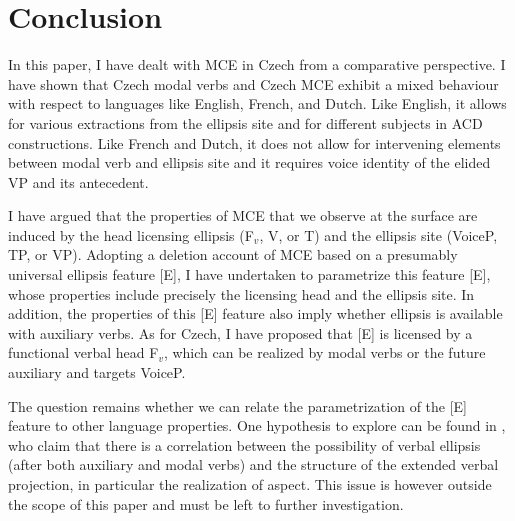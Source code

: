 \documentclass[output=paper,colorlinks,citecolor=brown,
modfonts
]{langscibook}
\begin{document}
\section{Conclusion} \label{sec:6}

In this paper, I have dealt with MCE in Czech from a comparative perspective. I have shown that Czech modal verbs and Czech MCE exhibit a mixed behaviour with respect to languages like English, French, and Dutch. Like English, it allows for various extractions from the ellipsis site and for different subjects in ACD constructions. Like French and Dutch, it does not allow for intervening elements between modal verb and ellipsis site and it requires voice identity of the elided VP and its antecedent. 

I have argued that the properties of MCE that we observe at the surface are induced by the head licensing ellipsis (F$_{v}$, V, or T) and the ellipsis site (VoiceP, TP, or VP). Adopting a deletion account of MCE based on a presumably universal ellipsis feature [E], I have undertaken to parametrize this feature [E], whose properties include precisely the licensing head and the ellipsis site. In addition, the properties of this [E] feature also imply whether ellipsis is available with auxiliary verbs. As for Czech, I have proposed that [E] is licensed by a functional verbal head F$_{v}$, which can be realized by modal verbs or the future auxiliary and targets VoiceP. 

The question remains whether we can relate the parametrization of the [E] feature to other language properties. One hypothesis to explore can be found in \cite{Cyrino-Matos2002}, who claim that there is a correlation between the possibility of verbal ellipsis (after both auxiliary and modal verbs) and the structure of the extended verbal projection, in particular the realization of aspect. This issue is however outside the scope of this paper and must be left to further investigation.
\end{document}
